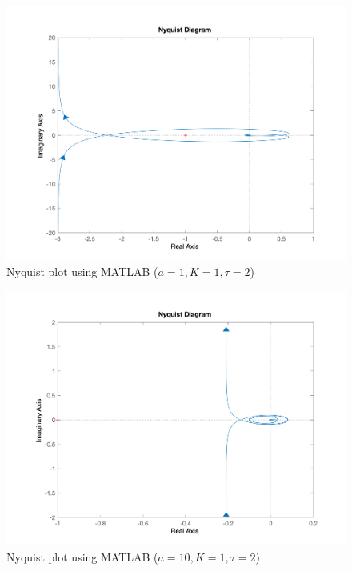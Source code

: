 \begin{figure}[H]
	\caption{Nyquist plot using MATLAB ($a = 1, K = 1, \tau = 2$)}
	\centering
	\includegraphics[width=12cm]{../Figure/Q3/MATLAB-Nyquist_increase_tau.png}
\end{figure}

\begin{figure}[H]
	\caption{Nyquist plot using MATLAB ($a = 10, K = 1, \tau = 2$)}
	\centering
	\includegraphics[width=12cm]{../Figure/Q3/MATLAB-Nyquist_increase_tau_and_a.png}
\end{figure}




